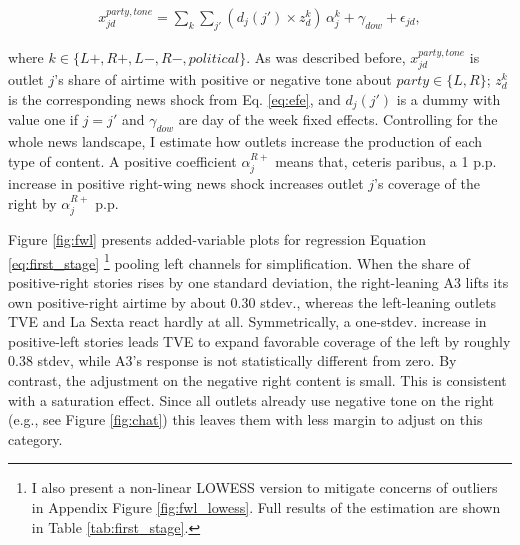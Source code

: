 \documentclass[12pt]{article}
\begin{document}

\begin{equation}\label{eq:first_stage}
	\begin{aligned}
		 x^{party, tone}_{jd} =	\sum_{k} \sum_{j'}
		\left(d_j(j') \times z^{k}_d\right)\,\alpha_{j}^{k}
		+ \gamma_{dow}+\epsilon_{jd},
	\end{aligned}
\end{equation}

where $k \in\{L+,R+,L-,R-, political\}$. As was described before,  $x^{party, tone}_{jd}$ is outlet $j$’s share of airtime with positive or negative tone about $party \in \{L,R\}$;  $z^{k}_d$ is the corresponding news shock from Eq. \ref{eq:efe}, and $d_j(j')$ is a dummy with value one if $j=j'$ and $\gamma_{dow}$ are day of the week fixed effects.  Controlling for the whole news landscape, I estimate how outlets increase the production of each type of content.
A positive coefficient $\alpha_{j}^{R+}$ means that, ceteris paribus, a 1 p.p. increase in  positive right-wing news shock increases outlet $j$’s coverage of the right by $\alpha_{j}^{R+}$ p.p.

 Figure \ref{fig:fwl} presents added-variable plots for regression Equation  \eqref{eq:first_stage} \footnote{I also present a non-linear LOWESS version to mitigate concerns of outliers in Appendix Figure \ref{fig:fwl_lowess}. Full results of the estimation are shown in Table \ref{tab:first_stage}.} pooling left channels for simplification.  When the share of  positive-right stories rises by one standard deviation, the right-leaning A3 lifts its own positive-right airtime by about 0.30 stdev., whereas the left-leaning outlets TVE and La Sexta react hardly at all.  Symmetrically, a one-stdev. increase in positive-left stories leads TVE to expand favorable coverage of the left by roughly 0.38 stdev, while A3’s response is not statistically different from zero.   By contrast, the adjustment on the negative right content is small. This is consistent with a saturation effect. Since all outlets already use negative tone on the right  (e.g., see Figure \ref{fig:chat}) this leaves them with less margin to adjust on this category. 
 
\end{document}
